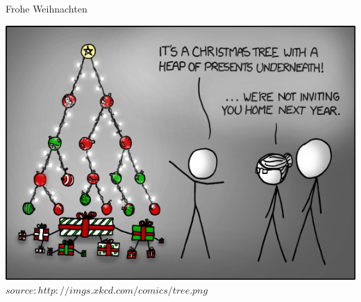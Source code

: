 		
	\begin{frame} {Frohe Weihnachten}
		\begin{center}
			\includegraphics[scale=0.45]{graphics/eof9.png}\\
			\tiny $source: http://imgs.xkcd.com/comics/tree.png$
		\end{center}
	\end{frame}


